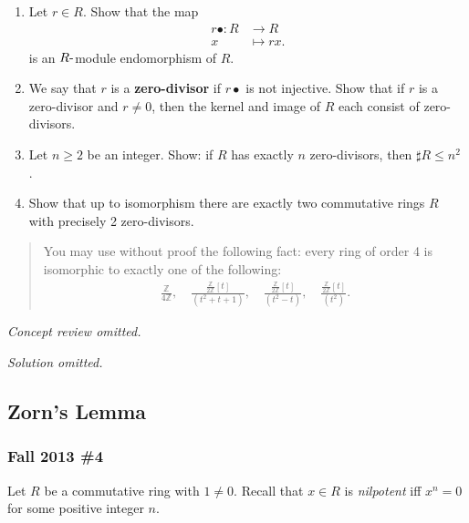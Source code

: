 \begin{enumerate}
\def\labelenumi{\alph{enumi}.}
\item
  Let \(r \in R\). Show that the map
  \begin{align*}
  r\bullet : R &\to R \\
  x &\mapsto r x
  .\end{align*}
  is an \(R{\hbox{-}}\)module endomorphism of \(R\).
\item
  We say that \(r\) is a \textbf{zero-divisor} if \(r\bullet\) is not
  injective. Show that if \(r\) is a zero-divisor and \(r \neq 0\), then
  the kernel and image of \(R\) each consist of zero-divisors.
\item
  Let \(n \geq 2\) be an integer. Show: if \(R\) has exactly \(n\)
  zero-divisors, then \({\sharp}R \leq n^2\) .
\item
  Show that up to isomorphism there are exactly two commutative rings
  \(R\) with precisely 2 zero-divisors.
\end{enumerate}

\begin{quote}
You may use without proof the following fact: every ring of order 4 is
isomorphic to exactly one of the following:
\begin{align*}
\frac{ {\mathbb{Z}}}{ 4{\mathbb{Z}}}, \quad
\frac{ \frac{  {\mathbb{Z}}}{ 2{\mathbb{Z}}} [t]}{(t^2 + t + 1)}, \quad
\frac{ \frac{ {\mathbb{Z}}}{ 2{\mathbb{Z}}} [t]}{ (t^2 - t)}, \quad
\frac{ \frac{ {\mathbb{Z}}}{2{\mathbb{Z}}}[t]}{(t^2 )}
.\end{align*}
\end{quote}

\emph{Concept review omitted.}

\emph{Solution omitted.}

\hypertarget{zorns-lemma}{%
\subsection{Zorn's Lemma}\label{zorns-lemma}}

\hypertarget{fall-2013-4}{%
\subsubsection{Fall 2013 \#4}\label{fall-2013-4}}

Let \(R\) be a commutative ring with \(1\neq 0\). Recall that \(x\in R\)
is \emph{nilpotent} iff \(x^n = 0\) for some positive integer \(n\).

